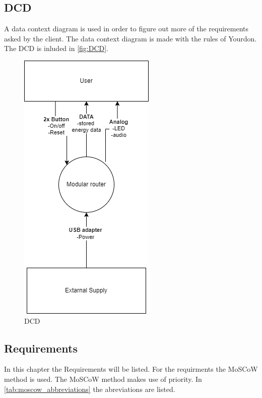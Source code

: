 \subsection{DCD}
A data context diagram is used in order to figure out more of the requirements asked by the client. The data context diagram is made with the rules of Yourdon. The DCD is inluded in \autoref{fig:DCD}.

\begin{figure}[H]
    \centering
    \includegraphics{Images/Definition phase/DCD.drawio.png}
    \caption{DCD}
    \label{fig:DCD}
\end{figure}

\newpage
\subsection{Requirements}
In this chapter the Requirements will be listed. For the requirments the MoSCoW method is used. The MoSCoW method makes use of priority. In \autoref{tab:moscow_abbreviations} the abreviations are listed.

